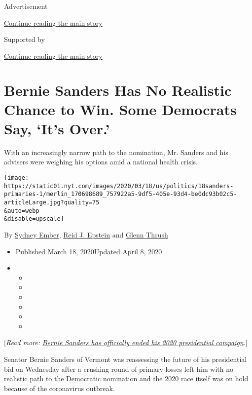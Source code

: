 Advertisement

\protect\hyperlink{after-top}{Continue reading the main story}

Supported by

\protect\hyperlink{after-sponsor}{Continue reading the main story}

\hypertarget{bernie-sanders-has-no-realistic-chance-to-win-some-democrats-say-its-over}{%
\section{Bernie Sanders Has No Realistic Chance to Win. Some Democrats
Say, `It's
Over.'}\label{bernie-sanders-has-no-realistic-chance-to-win-some-democrats-say-its-over}}

With an increasingly narrow path to the nomination, Mr. Sanders and his
advisers were weighing his options amid a national health crisis.

\texttt{[image: https://static01.nyt.com/images/2020/03/18/us/politics/18sanders-primaries-1/merlin\_170698689\_757922a5-9df5-405e-93d4-be0dc93b02c5-articleLarge.jpg?quality=75\\\&auto=webp\\\&disable=upscale]}

By \href{https://www.nytimes.com/by/sydney-ember}{Sydney Ember},
\href{https://www.nytimes.com/by/reid-j-epstein}{Reid J. Epstein} and
\href{https://www.nytimes.com/by/glenn-thrush}{Glenn Thrush}

\begin{itemize}
\item
  Published March 18, 2020Updated April 8, 2020
\item
  \begin{itemize}
  \item
  \item
  \item
  \item
  \item
  \item
  \end{itemize}
\end{itemize}

{[}\emph{Read more:}
\href{https://www.nytimes.com/2020/04/08/us/politics/bernie-sanders-drops-out.html}{\emph{Bernie
Sanders has officially ended his 2020 presidential campaign}}.{]}

Senator Bernie Sanders of Vermont was reassessing the future of his
presidential bid on Wednesday after a crushing round of primary losses
left him with no realistic path to the Democratic nomination and the
2020 race itself was on hold because of the coronavirus outbreak.

